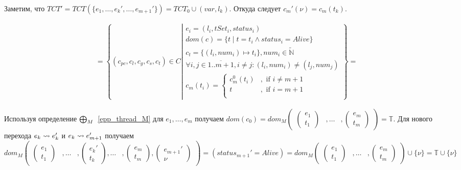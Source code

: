Заметим, что $TCT' = TCT(\{e_1, \dots, e_k', \dots, e_{m+1}'\}) = TCT_0 \cup {(var, l_k)}$. Откуда следует $c_m'(\nu) = c_m(t_k)$.

\begin{align}
& = \left\lbrace (c_{pc},c_l,c_g,c_s, c_t) \in C 
\left| 
\begin{array}{c}
e_i = (l_i, tSet_i, status_i) \\
dom(c) = \{t \mid t = t_i \land status_i = Alive\}\\
c_t = \{(l_i, num_i) \mapsto t_i\}, num_i \in \tilde{\mathbb{N}} \\
\forall i, j \in \overline{1..m+1}, i \neq j: (l_i, num_i) \neq (l_j, num_j)\\
c_m(t_i) = \begin{cases}
c^0_m(t_i)&, \mbox{ if } i \neq m+1 \\
t&, \mbox{ if } i = m+1 \\
\end{cases}
\end{array}
\right.
\right\rbrace = \nonumber
\end{align}

Используя определение $\mathrel{\bigoplus}_M$~\ref{epp_thread_M}
для $e_1, \dots, e_m$ получаем
$dom(c_0) = dom_M\begin{pmatrix}
\begin{pmatrix}
e_1 \\
t_1 
\end{pmatrix}& ,
\dots& ,
\begin{pmatrix}
e_m \\
t_m 
\end{pmatrix}
\end{pmatrix} = \mathbb{T}$.
Для нового перехода $e_k \leadsto e_k'$ и $e_k \leadsto e_{m+1}'$ получаем $dom_M\begin{pmatrix}
\begin{pmatrix}
e_1 \\
t_1 
\end{pmatrix}& ,
\dots& ,
\begin{pmatrix}
e_k' \\
t_k 
\end{pmatrix} ,
\dots& ,
\begin{pmatrix}
e_m \\
t_m 
\end{pmatrix},
\begin{pmatrix}
e_{m+1}' \\
\nu 
\end{pmatrix}
\end{pmatrix} = (status_{m+1}' = Alive) = dom_M\begin{pmatrix}
\begin{pmatrix}
e_1 \\
t_1 
\end{pmatrix}& ,
\dots& ,
\begin{pmatrix}
e_m \\
t_m 
\end{pmatrix}
\end{pmatrix} \cup \{\nu\} = \mathbb{T} \cup \{\nu\}$

